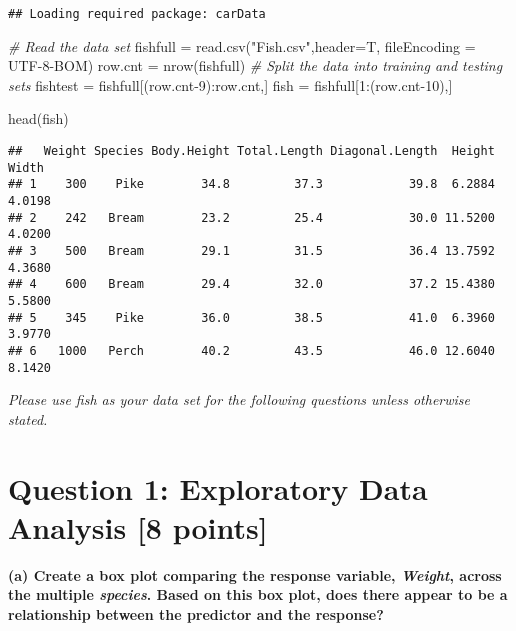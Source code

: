 \documentclass[
]{article}
\newenvironment{Shaded}{\begin{snugshade}}{\end{snugshade}}
\newcommand{\AttributeTok}[1]{\textcolor[rgb]{0.77,0.63,0.00}{#1}}
\newcommand{\CommentTok}[1]{\textcolor[rgb]{0.56,0.35,0.01}{\textit{#1}}}
\newcommand{\DecValTok}[1]{\textcolor[rgb]{0.00,0.00,0.81}{#1}}
\newcommand{\FunctionTok}[1]{\textcolor[rgb]{0.00,0.00,0.00}{#1}}
\newcommand{\NormalTok}[1]{#1}
\newcommand{\OtherTok}[1]{\textcolor[rgb]{0.56,0.35,0.01}{#1}}
\newcommand{\SpecialCharTok}[1]{\textcolor[rgb]{0.00,0.00,0.00}{#1}}
\newcommand{\StringTok}[1]{\textcolor[rgb]{0.31,0.60,0.02}{#1}}
\begin{document}
\begin{verbatim}
## Loading required package: carData
\end{verbatim}

\begin{Shaded}
\begin{Highlighting}[]
\CommentTok{\# Read the data set}
\NormalTok{fishfull }\OtherTok{=} \FunctionTok{read.csv}\NormalTok{(}\StringTok{"Fish.csv"}\NormalTok{,}\AttributeTok{header=}\NormalTok{T, }\AttributeTok{fileEncoding =} \StringTok{\textquotesingle{}UTF{-}8{-}BOM\textquotesingle{}}\NormalTok{)}
\NormalTok{row.cnt }\OtherTok{=} \FunctionTok{nrow}\NormalTok{(fishfull)}
\CommentTok{\# Split the data into training and testing sets}
\NormalTok{fishtest }\OtherTok{=}\NormalTok{ fishfull[(row.cnt}\DecValTok{{-}9}\NormalTok{)}\SpecialCharTok{:}\NormalTok{row.cnt,]}
\NormalTok{fish }\OtherTok{=}\NormalTok{ fishfull[}\DecValTok{1}\SpecialCharTok{:}\NormalTok{(row.cnt}\DecValTok{{-}10}\NormalTok{),]}

\FunctionTok{head}\NormalTok{(fish)}
\end{Highlighting}
\end{Shaded}

\begin{verbatim}
##   Weight Species Body.Height Total.Length Diagonal.Length  Height  Width
## 1    300    Pike        34.8         37.3            39.8  6.2884 4.0198
## 2    242   Bream        23.2         25.4            30.0 11.5200 4.0200
## 3    500   Bream        29.1         31.5            36.4 13.7592 4.3680
## 4    600   Bream        29.4         32.0            37.2 15.4380 5.5800
## 5    345    Pike        36.0         38.5            41.0  6.3960 3.9770
## 6   1000   Perch        40.2         43.5            46.0 12.6040 8.1420
\end{verbatim}

\emph{Please use fish as your data set for the following questions
unless otherwise stated.}

\hypertarget{question-1-exploratory-data-analysis-8-points}{%
\section{Question 1: Exploratory Data Analysis {[}8
points{]}}\label{question-1-exploratory-data-analysis-8-points}}

\textbf{(a) Create a box plot comparing the response variable,
\emph{Weight}, across the multiple \emph{species}. Based on this box
plot, does there appear to be a relationship between the predictor and
the response?}
\end{document}
